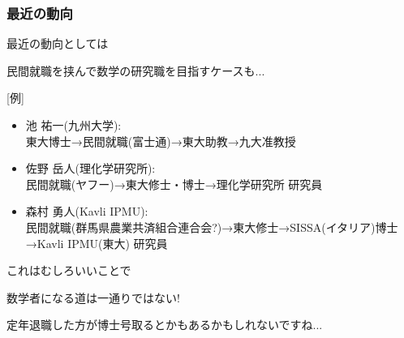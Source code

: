 \documentclass[11pt,dvipdfmx]{beamer}
\theoremstyle{definition}
\theoremstyle{remark}
\begin{document}
 \begin{frame} 
 \frametitle{最近の動向}

最近の動向としては
 \begin{block}{}
\begin{center}
民間就職を挟んで数学の研究職を目指すケースも...
\end{center}
\end{block}
[例]
\begin{itemize}
\item 池 祐一(九州大学): \\ 東大博士→民間就職(富士通)→東大助教→九大准教授
\item 佐野 岳人(理化学研究所): \\ 民間就職(ヤフー)→東大修士・博士→理化学研究所 研究員
\item 森村 勇人(Kavli IPMU): \\ 民間就職(群馬県農業共済組合連合会?)→東大修士→SISSA(イタリア)博士→Kavli IPMU(東大) 研究員
\end{itemize}

\vspace{11pt}
\pause
これはむしろいいことで
 \begin{block}{}
\begin{center}
数学者になる道は一通りではない!
\end{center}
\end{block}

定年退職した方が博士号取るとかもあるかもしれないですね...
 \end{frame}
\end{document}
